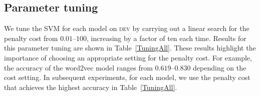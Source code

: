 \documentclass[11pt,a4paper]{article}
\newcommand{\tabref}[1]{Table~\ref{#1}}
\newcommand{\dev}{\textsc{dev}\xspace}
\begin{document}
%


\subsection{Parameter tuning}


We tune the SVM for each model on \dev by carrying out a linear search
for the penalty cost from $0.01$--$100$, increasing by a factor of ten
each time. Results for this parameter tuning are shown in
\tabref{TuningAll}. These results highlight the importance of choosing
an appropriate setting for the penalty cost. For example, the accuracy
of the word2vec model ranges from $0.619$--$0.830$ depending on the
cost setting. In subsequent experiments, for each model, we use the
penalty cost that achieves the highest accuracy in \tabref{TuningAll}.
\end{document}

